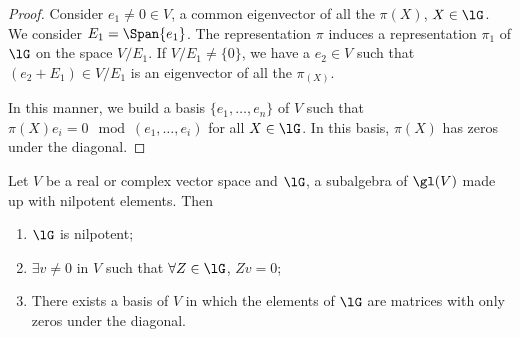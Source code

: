 \begin{proof}
Consider $e_1\neq 0\in V$, a common eigenvector of all the $\pi(X)$, $X\in\lG$. We consider $E_1=\Span\{e_1\}$. The representation $\pi$ induces a representation $\pi_1$ of $\lG$ on the space $V/E_1$. If $V/E_1\neq\{0\}$, we have a $e_2\in V$ such that $(e_2+E_1)\in V/E_1$ is an eigenvector of all the $\pi_(X)$.

In this manner, we build a basis $\{e_1,\ldots,e_n\}$ of $V$ such that $\pi(X)e_i=0\mod(e_1,\ldots,e_i)$ for all $X\in\lG$. In this basis, $\pi(X)$ has zeros under the diagonal.
\end{proof}

\begin{theorem}
Let $V$ be a real or complex vector space and $\lG$, a subalgebra of $\gl(V)$ made up with nilpotent elements. Then

\begin{enumerate}
\item $\lG$ is nilpotent;
\item $\exists v\neq 0$ in $V$ such that $\forall Z\in\lG$, $Zv=0$;
\item There exists a basis of $V$ in which the elements of $\lG$ are matrices with only zeros under the diagonal.
\end{enumerate}
\label{tho:trois_nil}
\end{theorem}

